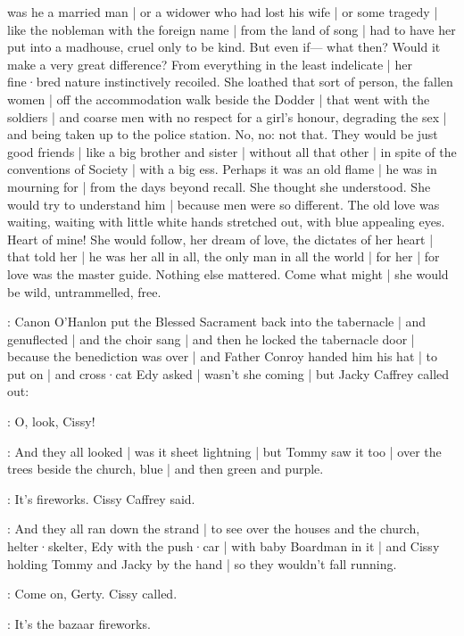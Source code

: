 was he a married man |
or a widower who had lost his wife |
or some tragedy |
like the nobleman with the foreign name |
from the land of song |
had to have her put into a madhouse,
cruel only to be kind.
But even if—%
what then?
Would it make a very great difference?%
From everything in the least indelicate |
her fine·bred nature instinctively recoiled.
She loathed that sort of person,
the fallen women |
off the accommodation walk beside the Dodder |
that went with the soldiers |
and coarse men
with no respect for a girl's honour,
degrading the sex |
and being taken up to the police station.
No,
no:
not that.
They would be just good friends |
like a big brother and sister |
without all that other |
in spite of the conventions of Society |
with a big ess.
Perhaps it was an old flame |
he was in mourning for |
from the days beyond recall.
She thought she understood.
She would try to understand him |
because men were so different.
The old love was waiting,
waiting with little white hands stretched out,
with blue appealing eyes.%
Heart of mine!
She would follow,
her dream of love,
the dictates of her heart |
that told her |
he was her all in all,
the only man in all the world |
for her |
for love was the master guide.
Nothing else mattered.
Come what might |
she would be wild,
untrammelled,
free.

:
Canon O'Hanlon
put the Blessed Sacrament
back into the tabernacle |
and genuflected |
and the choir sang  |
and then he locked the tabernacle door |
because the benediction was over |
and Father Conroy handed him his hat |
to put on |
and cross·cat Edy asked |
wasn't she coming |
but Jacky Caffrey called out:

\jacky:
O,
look,
Cissy!

:
And they all looked |
was it sheet lightning |%
but Tommy saw it too |
over the trees beside the church,
blue |
and then green
and purple.

\cissy:
It's fireworks.
Cissy Caffrey said.

:
And they all ran down the strand |
to see over the houses
and the church,
helter·skelter,
Edy with the push·car |
with baby Boardman in it |
and Cissy holding Tommy and Jacky by the hand |
so they wouldn't fall running.

\cissy:
Come on,
Gerty.
Cissy called.

\cissy:
It's the bazaar fireworks.

